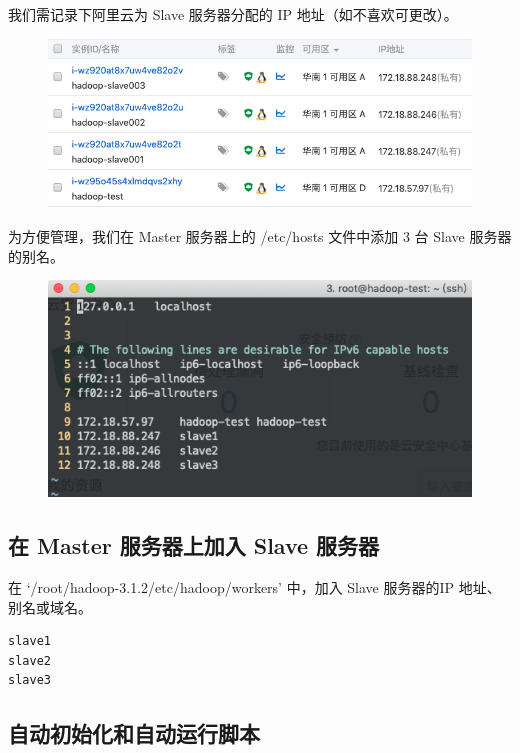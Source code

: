 \documentclass{article}
\begin{document}
我们需记录下阿里云为 Slave 服务器分配的 IP 地址（如不喜欢可更改）。

\begin{figure}[!ht]
\centering
\includegraphics[scale=0.5]{image/14.png}
\end{figure}

为方便管理，我们在 Master 服务器上的 /etc/hosts 文件中添加 $3$ 台 Slave 服务器的别名。

\begin{figure}[!ht]
\centering
\includegraphics[scale=0.5]{image/15.png}
\end{figure}

\subsection{在 Master 服务器上加入 Slave 服务器}

在 `/root/hadoop-3.1.2/etc/hadoop/workers' 中，加入 Slave 服务器的IP 地址、别名或域名。

\begin{lstlisting}
slave1
slave2
slave3
\end{lstlisting}

\subsection{自动初始化和自动运行脚本}
\end{document}
